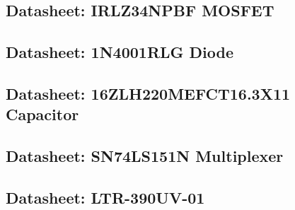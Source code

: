 \documentclass[12pt]{article} %
\begin{document}
\subsection{Datasheet: IRLZ34NPBF MOSFET}
\label{appendix:mosfet}

\pagebreak
\subsection{Datasheet: 1N4001RLG Diode}

\pagebreak
\subsection{Datasheet: 16ZLH220MEFCT16.3X11 Capacitor}

\pagebreak
\subsection{Datasheet: SN74LS151N Multiplexer}

\pagebreak
\subsection{Datasheet: LTR-390UV-01}
\label{appendix:ltr390}

\end{document}
